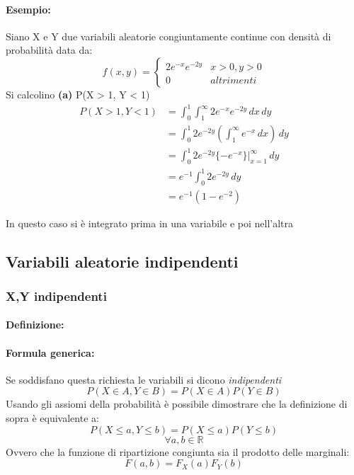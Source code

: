 \documentclass[]{article}
\newcommand{\definizione}{\paragraph{Definizione:}}
\newcommand{\formula}{\paragraph{Formula generica:}}
\begin{document}
    \paragraph{Esempio:} Siano X e Y due variabili aleatorie congiuntamente continue con densità
    di probabilità data da:
    \begin{equation*}
        f(x,y) =
        \begin{cases}
            2e^{-x} e^{-2y} & x > 0, y > 0 \\
            0 & altrimenti
        \end{cases}
    \end{equation*}
    Si calcolino \textbf{(a)} P(X > 1, Y < 1)
    \begin{equation*}
        \begin{split}
            P(X > 1, Y < 1) & = \int_{0}^{1} \int_{1}^{\infty} 2e^{-x} e^{-2y} \, dx \, dy \\
            & = \int_{0}^{1} 2e^{-2y} (\int_{1}^{\infty} e^{-x} \, dx) \, dy \\
            & = \int_{0}^{1} 2e^{-2y}\{ -e^{-x}\} \rvert_{x=1}^{\infty} \, dy \\
            & = e^{-1} \int_{0}^{1} 2e^{-2y} \, dy \\
            & = e^{-1}(1 - e^{-2})
        \end{split}
    \end{equation*}
    \centerline{In questo caso si è integrato prima in una variabile e poi nell'altra}

    \subsection{Variabili aleatorie indipendenti}
    \subsubsection{X,Y indipendenti}
    \definizione
    \formula Se soddisfano questa richiesta le variabili si dicono \textit{indipendenti} 
    \[ P(X \in A, Y \in B) = P(X \in A) P(Y \in B)\]
    Usando gli assiomi della probabilità è possibile dimostrare che la definizione di sopra è equivalente a:
    \[ P(X \leq a, Y \leq b) = P(X \leq a) P(Y \leq b)\]
    \[ \forall a,b \in \mathbb{R} \]
    \linebreak[3]
    Ovvero che la funzione di ripartizione congiunta sia il prodotto delle marginali:
    \[ F(a,b) = F_X(a) F_Y(b)\]
\end{document}
